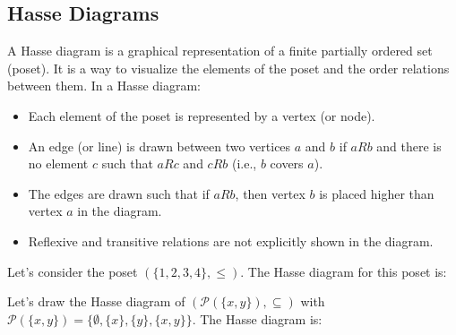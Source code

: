 \subsection{Hasse Diagrams}
\begin{definition}
    A Hasse diagram is a graphical representation of a finite partially ordered set (poset). It is a way to visualize the elements of the poset and the order relations between them. In a Hasse diagram:
    \begin{itemize}[itemsep=1pt,label=$\circ$]
        \item Each element of the poset is represented by a vertex (or node).
        \item An edge (or line) is drawn between two vertices $a$ and $b$ if $a R b$ and there is no element $c$ such that $a R c$ and $c R b$ (i.e., $b$ covers $a$).
        \item The edges are drawn such that if $a R b$, then vertex $b$ is placed higher than vertex $a$ in the diagram.
        \item Reflexive and transitive relations are not explicitly shown in the diagram.
    \end{itemize}
\end{definition}
\begin{eg}
    Let's consider the poset $(\{1,2,3,4\}, \leq)$. The Hasse diagram for this poset is:
    \begin{center}
    \end{center}
\end{eg}

\begin{eg}
    Let's draw the Hasse diagram of $(\mathcal{P}(\{x,y\}), \subseteq)$ with $\mathcal{P}(\{x,y\}) = \{\emptyset, \{x\}, \{y\}, \{x,y\}\}$. The Hasse diagram is:
    \begin{center}
    \end{center}
\end{eg}

